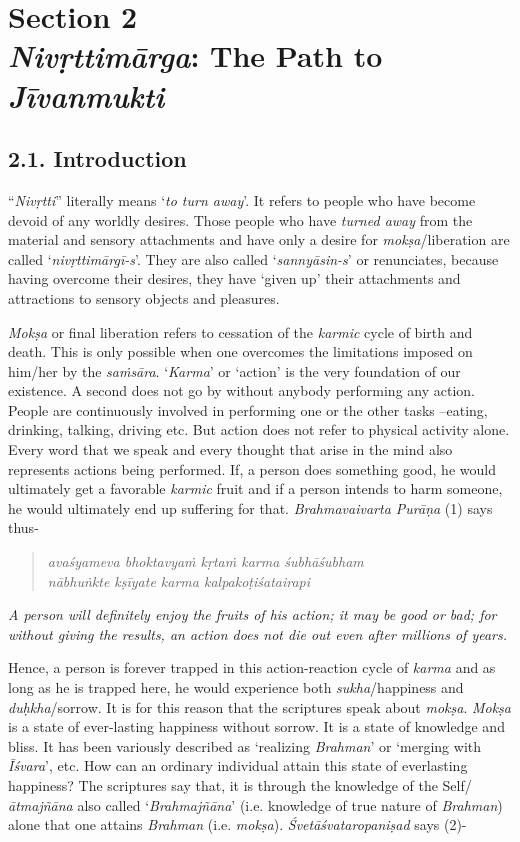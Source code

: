 \chapter{\textbf{Section 2\\ \emph{Nivṛttimārga}: The Path to \emph{Jīvanmukti}}}

\section*{2.1. Introduction}

``\emph{Nivṛtti}'' literally means `\emph{to turn away}'. It refers to people who have become devoid of any worldly desires. Those people who have \emph{turned away} from the material and sensory attachments and have only a desire for \emph{mokṣa}/liberation are called `\emph{nivṛttimārgī-s}'. They are also called `\emph{sannyāsin-s}' or renunciates, because having overcome their desires, they have `given up' their attachments and attractions to sensory objects and pleasures.

\emph{Mokṣa} or final liberation refers to cessation of the \emph{karmic} cycle of birth and death. This is only possible when one overcomes the limitations imposed on him/her by the \emph{saṁsāra}. `\emph{Karma}' or `action' is the very foundation of our existence. A second does not go by without anybody performing any action. People are continuously involved in performing one or the other tasks --eating, drinking, talking, driving etc. But action does not refer to physical activity alone. Every word that we speak and every thought that arise in the mind also represents actions being performed. If, a person does something good, he would ultimately get a favorable \emph{karmic} fruit and if a person intends to harm someone, he would ultimately end up suffering for that. \emph{Brahmavaivarta Purāṇa} (1) says thus-

\begin{verse}
\emph{avaśyameva bhoktavyaṁ kṛtaṁ karma śubhāśubham }\\
\emph{nābhuṅkte kṣīyate karma kalpakoṭiśatairapi }
\end{verse}

\emph{A person will definitely enjoy the fruits of his action; it may be good or bad; for without giving the results, an action does not die out even after millions of years.}

Hence, a person is forever trapped in this action-reaction cycle of \emph{karma} and as long as he is trapped here, he would experience both \emph{sukha}/happiness and \emph{duḥkha}/sorrow. It is for this reason that the scriptures speak about \emph{mokṣa}. \emph{Mokṣa} is a state of ever-lasting happiness without sorrow. It is a state of knowledge and bliss. It has been variously described as `realizing \emph{Brahman}' or `merging with \emph{Īśvara}', etc. How can an ordinary individual attain this state of everlasting happiness? The scriptures say that, it is through the knowledge of the Self/\emph{ātmajñāna} also called `\emph{Brahmajñāna}' (i.e. knowledge of true nature of \emph{Brahman}) alone that one attains \emph{Brahman} (i.e. \emph{mokṣa}). \emph{Śvetāśvataropaniṣad} says (2)-

